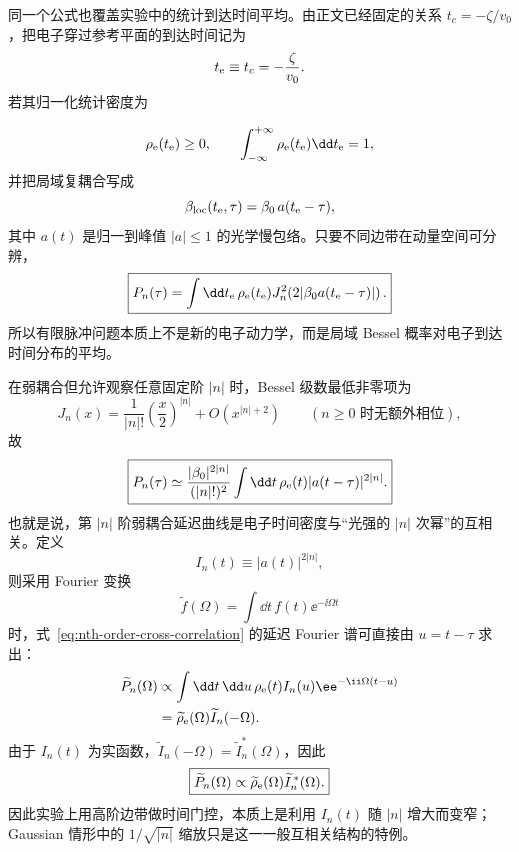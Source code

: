 同一个公式也覆盖实验中的统计到达时间平均。由正文已经固定的关系 $t_c=-\zeta/v_0$，把电子穿过参考平面的到达时间记为
\begin{equation}
 t_{\rm e}\equiv t_c=-\frac{\zeta}{v_0}.
 \label{eq:arrival-time-zeta}
\end{equation}
若其归一化统计密度为

\begin{equation}
 \rho_{\rm e}(t_{\rm e})\ge0,
 \qquad
 \int_{-\infty}^{+\infty}\rho_{\rm e}(t_{\rm e})\dd t_{\rm e}=1,
 \label{eq:general-electron-time-density}
\end{equation}
并把局域复耦合写成
\begin{equation}
 \beta_{\rm loc}(t_{\rm e},\tau)
 =\beta_0\,a(t_{\rm e}-\tau),
 \label{eq:general-pulse-local-beta}
\end{equation}
其中 $a(t)$ 是归一到峰值 $|a|\le1$ 的光学慢包络。只要不同边带在动量空间可分辨，
\begin{equation}
 \boxed{
 P_n(\tau)=\int\dd t_{\rm e}\,
 \rho_{\rm e}(t_{\rm e})
 J_n^2\!\left(2|\beta_0a(t_{\rm e}-\tau)|\right).}
 \label{eq:general-pulse-convolution}
\end{equation}
所以有限脉冲问题本质上不是新的电子动力学，而是局域 Bessel 概率对电子到达时间分布的平均。

在弱耦合但允许观察任意固定阶 $|n|$ 时，Bessel 级数最低非零项为
\begin{equation}
 J_n(x)
 =\frac{1}{|n|!}\left(\frac{x}{2}\right)^{|n|}
 +O\!\left(x^{|n|+2}\right)
 \qquad (n\ge0\text{ 时无额外相位}),
 \label{eq:bessel-fixed-order-weak}
\end{equation}
故
\begin{equation}
 \boxed{
 P_n(\tau)
 \simeq
 \frac{|\beta_0|^{2|n|}}{(|n|!)^2}
 \int\dd t\,
 \rho_{\rm e}(t)
 |a(t-\tau)|^{2|n|}.}
 \label{eq:nth-order-cross-correlation}
\end{equation}
也就是说，第 $|n|$ 阶弱耦合延迟曲线是电子时间密度与“光强的 $|n|$ 次幂”的互相关。定义
\begin{equation}
 I_n(t)\equiv|a(t)|^{2|n|},
\end{equation}
则采用 Fourier 变换
\begin{equation}
 \widetilde f(\Omega)=\int\dd t\,f(t)\ee^{-\ii\Omega t}
\end{equation}
时，式~\eqref{eq:nth-order-cross-correlation} 的延迟 Fourier 谱可直接由 $u=t-\tau$ 求出：
\begin{align}
\widetilde P_n(\Omega)
&\propto\int\dd t\,\dd u\,
\rho_{\rm e}(t)I_n(u)
\ee^{-\ii\Omega(t-u)}\\
&=\widetilde\rho_{\rm e}(\Omega)
\widetilde I_n(-\Omega).
\end{align}
由于 $I_n(t)$ 为实函数，$\widetilde I_n(-\Omega)=\widetilde I_n^*(\Omega)$，因此
\begin{equation}
 \boxed{
 \widetilde P_n(\Omega)
 \propto
 \widetilde\rho_{\rm e}(\Omega)
 \widetilde I_n^{\,*}(\Omega).}
 \label{eq:delay-cross-correlation-fourier}
\end{equation}
因此实验上用高阶边带做时间门控，本质上是利用 $I_n(t)$ 随 $|n|$ 增大而变窄；Gaussian 情形中的 $1/\sqrt{|n|}$ 缩放只是这一一般互相关结构的特例。



